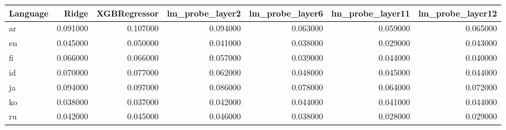 \begin{tabular}{lrrrrrr}
\toprule
Language & Ridge & XGBRegressor & lm_probe_layer2 & lm_probe_layer6 & lm_probe_layer11 & lm_probe_layer12 \\
\midrule
ar & 0.091000 & 0.107000 & 0.094000 & 0.063000 & 0.059000 & 0.065000 \\
en & 0.045000 & 0.050000 & 0.041000 & 0.038000 & 0.029000 & 0.043000 \\
fi & 0.066000 & 0.066000 & 0.057000 & 0.039000 & 0.044000 & 0.040000 \\
id & 0.070000 & 0.077000 & 0.062000 & 0.048000 & 0.045000 & 0.044000 \\
ja & 0.094000 & 0.097000 & 0.086000 & 0.078000 & 0.064000 & 0.072000 \\
ko & 0.038000 & 0.037000 & 0.042000 & 0.044000 & 0.041000 & 0.044000 \\
ru & 0.042000 & 0.045000 & 0.046000 & 0.038000 & 0.028000 & 0.029000 \\
\bottomrule
\end{tabular}
